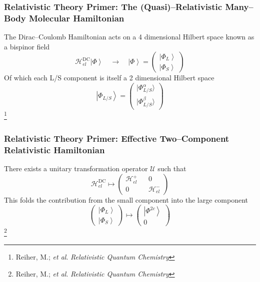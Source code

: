 \documentclass[usepdftitle=false,10pt]{beamer}
\newcommand{\ket}[1]{\left\vert #1 \right\rangle}         %
\newcommand*\op[1]{\mathcal{#1}}
\newcommand\blfootnote[1]{%
  \begingroup
  \renewcommand\thefootnote{}\footnote{#1}%
  \addtocounter{footnote}{-1}%
  \endgroup
}
\begin{document}
\begin{frame}
  \frametitle{Relativistic Theory Primer: The (Quasi)--Relativistic Many--Body 
  Molecular Hamiltonian}

  The Dirac--Coulomb Hamiltonian acts on a 4 dimensional Hilbert space
  known as a bispinor field
  \begin{equation*}
    \op{H}_{el}^\mathrm{DC} \ket{\Phi} \quad \rightarrow \quad 
    \ket{\Phi} = \begin{pmatrix} \ket{\Phi_L} \\ \ket{\Phi_S} \end{pmatrix}
  \end{equation*}
  Of which each L/S component is itself a 2 dimensional Hilbert space
  \begin{equation*}
    \ket{\Phi_{L/S}} =
      \begin{pmatrix} \vert\Phi_{L/S}^\alpha\rangle \\ \vert\Phi_{L/S}^\beta\rangle
      \end{pmatrix}
  \end{equation*}
  \blfootnote{\tiny Reiher, M.; \emph{et al}. \emph{Relativistic Quantum Chemistry}}

\end{frame}

\begin{frame}
  \frametitle{Relativistic Theory Primer: Effective Two--Component Relativistic
  Hamiltonian}

  There exists a unitary transformation operator $\op{U}$ such that
  \begin{equation*}
    \op{H}_{el}^\mathrm{DC} \mapsto 
    \begin{pmatrix} \op{H}_{el}^+ && 0 \\ 0 && \op{H}_{el}^- \end{pmatrix} 
  \end{equation*}
  This folds the contribution from the small component into the large component 
  \begin{equation*}
    \begin{pmatrix} \ket{\Phi_L} \\ \ket{\Phi_S} \end{pmatrix}\mapsto
    \begin{pmatrix} \ket{\Phi^{2c}} \\ 0 \end{pmatrix}
  \end{equation*}
  \blfootnote{\tiny Reiher, M.; \emph{et al}. \emph{Relativistic Quantum Chemistry}}
\end{frame}
\end{document}
